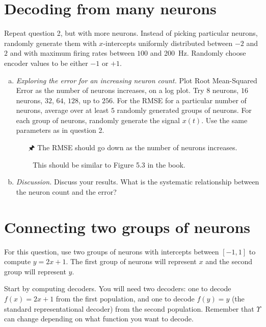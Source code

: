 	\newpage
	
	\section{Decoding from many neurons}
	
	Repeat question 2, but with more neurons. Instead of picking particular neurons, randomly generate them with $x$-intercepts uniformly distributed between $-2$ and $2$ and with maximum firing rates between $100$ and \SI{200}{\hertz}. Randomly choose encoder values to be either $-1$ or $+1$.

	\begin{enumerate}[a)]
		\item {} \emph{Exploring the error for an increasing neuron count.} Plot Root Mean-Squared Error as the number of neurons increases, on a log plot. Try $8$ neurons, $16$ neurons, $32$, $64$, $128$, up to $256$. For the RMSE for a particular number of neurons, average over at least $5$ randomly generated groups of neurons. For each group of neurons, randomly generate the signal $x(t)$. Use the same parameters as in question 2.
		\begin{itemize}
			\item[\symbolfont 🖈] The RMSE should go down as the number of neurons increases.
			\item[\symbolfont  📖] This should be similar to Figure 5.3 in the book.
		\end{itemize}
		\item {} \emph{Discussion.} Discuss your results. What is the systematic relationship between the neuron count and the error?
	\end{enumerate}

	\section{Connecting two groups of neurons}
		
	For this question, use two groups of neurons with intercepts between $[-1, 1]$ to compute $y = 2x+1$. The first group of neurons will represent $x$ and the second group will represent $y$.
	
	Start by computing decoders. You will need two decoders: one to decode $f(x)=2x+1$ from the first population, and one to decode $f(y)=y$ (the standard representational decoder) from the second population. Remember that $\Upsilon$ can change depending on what function you want to decode.
	

